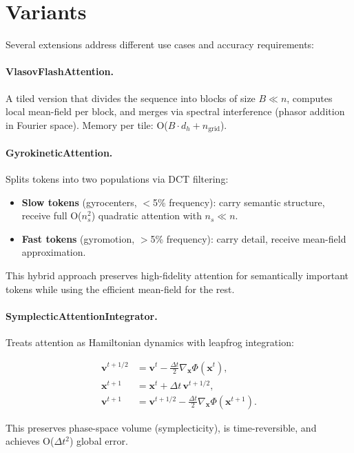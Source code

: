 \documentclass[11pt,a4paper,openright]{book}
\begin{document}
\section{Variants}

Several extensions address different use cases and accuracy requirements:

\paragraph{VlasovFlashAttention.}
A tiled version that divides the sequence into blocks of size $B \ll n$, computes local mean-field per block, and merges via spectral interference (phasor addition in Fourier space). Memory per tile: O($B \cdot d_h + n_\text{grid}$).

\paragraph{GyrokineticAttention.}
Splits tokens into two populations via DCT filtering:
\begin{itemize}
	\item \textbf{Slow tokens} (gyrocenters, $<$5\% frequency): carry semantic structure, receive full O($n_s^2$) quadratic attention with $n_s \ll n$.
	\item \textbf{Fast tokens} (gyromotion, $>$5\% frequency): carry detail, receive mean-field approximation.
\end{itemize}
This hybrid approach preserves high-fidelity attention for semantically important tokens while using the efficient mean-field for the rest.

\paragraph{SymplecticAttentionIntegrator.}
Treats attention as Hamiltonian dynamics with leapfrog integration:

\begin{align}
	\mathbf{v}^{t+1/2} & = \mathbf{v}^t - \frac{\Delta t}{2} \nabla_{\mathbf{x}} \Phi(\mathbf{x}^t),           \\
	\mathbf{x}^{t+1}   & = \mathbf{x}^t + \Delta t \, \mathbf{v}^{t+1/2},                                      \\
	\mathbf{v}^{t+1}   & = \mathbf{v}^{t+1/2} - \frac{\Delta t}{2} \nabla_{\mathbf{x}} \Phi(\mathbf{x}^{t+1}).
\end{align}

This preserves phase-space volume (symplecticity), is time-reversible, and achieves O($\Delta t^2$) global error.
\end{document}
